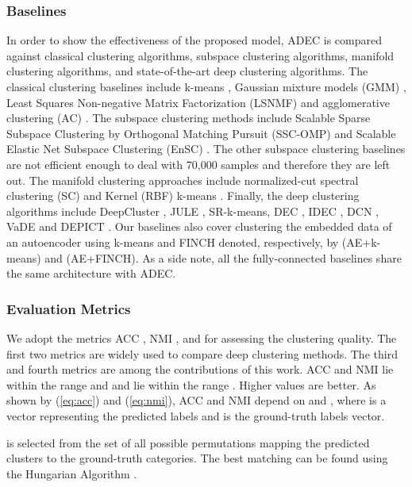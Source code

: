 \documentclass{article}
\begin{document}
\subsubsection{Baselines}
In order to show the effectiveness of the proposed model, ADEC is compared against classical clustering algorithms, subspace clustering algorithms, manifold clustering algorithms, and state-of-the-art deep clustering algorithms. The classical clustering baselines include k-means \cite{paper14}, Gaussian mixture models (GMM) \cite{paper47}, Least Squares Non-negative Matrix Factorization (LSNMF) \cite{paper75} and agglomerative clustering (AC) \cite{paper74}. The subspace clustering methods include Scalable Sparse Subspace Clustering by Orthogonal Matching Pursuit (SSC-OMP) \cite{paper78} and Scalable Elastic Net Subspace Clustering (EnSC) \cite{paper79}. The other subspace clustering baselines are not efficient enough to deal with 70,000 samples and therefore they are left out. The manifold clustering approaches include normalized-cut spectral clustering (SC) \cite{paper76} and Kernel (RBF) k-means \cite{paper77}. Finally, the deep clustering algorithms include DeepCluster \cite{paper24}, JULE \cite{paper22}, SR-k-means\cite{paper73}, DEC \cite{paper27}, IDEC \cite{paper28}, DCN \cite{paper29}, VaDE \cite{paper35} and DEPICT \cite{paper36}. Our baselines also cover clustering the embedded data of an autoencoder using k-means and FINCH \cite{paper80} denoted, respectively, by (AE+k-means) and (AE+FINCH). As a side note, all the fully-connected baselines share the same architecture with ADEC. 

\subsubsection{Evaluation Metrics}
We adopt the metrics ACC \cite{paper41}, NMI \cite{paper42},  and  for assessing the clustering quality. The first two metrics are widely used to compare deep clustering methods. The third and fourth metrics are among the contributions of this work. ACC and NMI lie within the range  and  and  lie within the range . Higher values are better. As shown by (\ref{eq:acc}) and (\ref{eq:nmi}), ACC and NMI depend on  and , where  is a vector representing the predicted labels and  is the ground-truth labels vector.



 is selected from the set of all possible permutations mapping the predicted clusters to the ground-truth categories. The best matching can be found using the Hungarian Algorithm \cite{paper43}.
\end{document}
